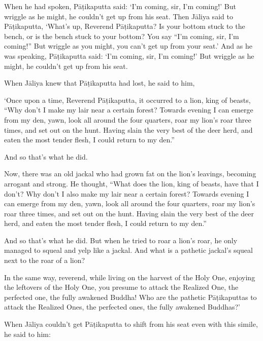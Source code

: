 \documentclass[12pt,openany]{book}%
\begin{document}
When he had spoken, \textsanskrit{Pāṭikaputta} said: ‘I’m coming, sir, I’m coming!’ But wriggle as he might, he couldn’t get up from his seat. Then \textsanskrit{Jāliya} said to \textsanskrit{Pāṭikaputta}, ‘What’s up, Reverend \textsanskrit{Pāṭikaputta}? Is your bottom stuck to the bench, or is the bench stuck to your bottom? You say “I’m coming, sir, I’m coming!” But wriggle as you might, you can’t get up from your seat.’ And as he was speaking, \textsanskrit{Pāṭikaputta} said: ‘I’m coming, sir, I’m coming!’ But wriggle as he might, he couldn’t get up from his seat. 

When \textsanskrit{Jāliya} knew that \textsanskrit{Pāṭikaputta} had lost, he said to him, 

‘Once upon a time, Reverend \textsanskrit{Pāṭikaputta}, it occurred to a lion, king of beasts, “Why don’t I make my lair near a certain forest? Towards evening I can emerge from my den, yawn, look all around the four quarters, roar my lion’s roar three times, and set out on the hunt. Having slain the very best of the deer herd, and eaten the most tender flesh, I could return to my den.” 

And so that’s what he did. 

Now, there was an old jackal who had grown fat on the lion’s leavings, becoming arrogant and strong. He thought, “What does the lion, king of beasts, have that I don’t? Why don’t I also make my lair near a certain forest? Towards evening I can emerge from my den, yawn, look all around the four quarters, roar my lion’s roar three times, and set out on the hunt. Having slain the very best of the deer herd, and eaten the most tender flesh, I could return to my den.” 

And so that’s what he did. But when he tried to roar a lion’s roar, he only managed to squeal and yelp like a jackal. And what is a pathetic jackal’s squeal next to the roar of a lion? 

In the same way, reverend, while living on the harvest of the Holy One, enjoying the leftovers of the Holy One, you presume to attack the Realized One, the perfected one, the fully awakened Buddha! Who are the pathetic \textsanskrit{Pāṭikaputtas} to attack the Realized Ones, the perfected ones, the fully awakened Buddhas?’ 

When \textsanskrit{Jāliya} couldn’t get \textsanskrit{Pāṭikaputta} to shift from his seat even with this simile, he said to him: 
\end{document}
